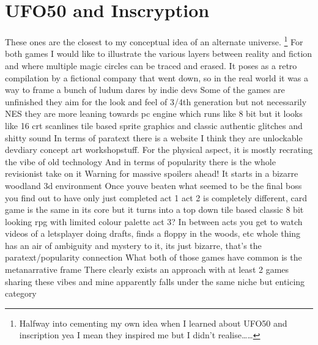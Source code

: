 \documentclass[12pt,oneside]{book}
\begin{document}
\section{UFO50 and Inscryption}
These ones are the closest to my conceptual idea of an alternate universe.
\footnote{Halfway into cementing my own idea when I learned about UFO50 and inscription yea I mean they inspired me but I didn't realise…\dots}
For both games I would like to illustrate the various layers between reality and fiction and where multiple magic circles can be traced and erased.
It poses as a retro compilation by a fictional company that went down, so in the real world it was a way to frame a bunch of ludum dares by indie devs
Some of the games are unfinished they aim for the look and feel of 3/4th generation but not necessarily NES they are more leaning towards pc engine which runs like 8 bit but it looks like 16 
crt scanlines tile based sprite graphics and classic authentic glitches and shitty sound 
In terms of paratext there is a website I think they are unlockable devdiary concept art workshopstuff. 
For the physical aspect, it is mostly recrating the vibe of old technology
And in terms of popularity there is the whole revisionist take on it 
Warning for massive spoilers ahead!
It starts in a bizarre woodland 3d environment
Once youve beaten what seemed to be the final boss you find out to have only just completed act 1
act 2 is completely different, card game is the same in its core but it turns into a top down tile based classic 8 bit looking rpg with limited colour palette
act 3?
In between acts you get to watch videos of a letsplayer doing drafts, finds a floppy in the woods, etc
whole thing has an air of ambiguity and mystery to it, its just bizarre, that's the paratext/popularity connection
What both of those games have common is the metanarrative frame 
There clearly exists an approach with at least 2 games sharing these vibes and mine apparently falls under the same niche but enticing category
\end{document}
